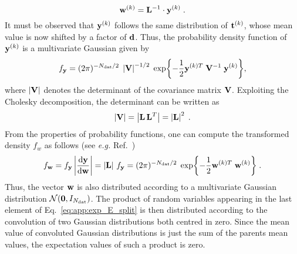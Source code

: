 \begin{equation}
    \mathbf{w}^{(k)} = \mathbf{L}^{-1} \cdot \mathbf{y}^{(k)} \;.
\end{equation}
It must be observed that $\mathbf{y}^{(k)}$ follows the same distribution of $\mathbf{t}^{(k)}$, whose mean value is now shifted by a factor of $\mathbf{d}$. Thus, the probability density function of $\mathbf{y}^{(k)}$ is a multivariate Gaussian given by
\begin{equation}
    f_{\mathbf{y}} = (2\pi)^{-N_{\textrm{dat}}/2} \; \left| \mathbf{V} \right|^{-1/2} \; \exp{-\frac{1}{2}{\mathbf{y}}^{(k)T} \; \mathbf{V}^{-1} \; \mathbf{y}^{(k)}},
\end{equation}
where $\left| \mathbf{V} \right|$ denotes the determinant of the covariance matrix $\mathbf{V}$. Exploiting the Cholesky decomposition, the determinant can be written as 
\begin{equation}
    \left| \mathbf{V} \right| = \left| \mathbf{L} \, \mathbf{L}^T \right| = \left| \mathbf{L} \right|^2 \;.
\end{equation}
From the properties of probability functions, one can compute the transformed density $f_w$ as follows (see \textit{e.g.} Ref.~\cite{Bohm:2005bu})
\begin{equation}
    f_{\mathbf{w}} = f_{\mathbf{y}} \left| \dv{\mathbf{y}}{\mathbf{w}} \right| = \left|\mathbf{L} \right| \, f_{\mathbf{y}} = (2\pi)^{-N_{\textrm{dat}}/2} \; \exp{-\frac{1}{2}\mathbf{w}^{(k)T} \; \mathbf{w}^{(k)}} \; .
\end{equation}
Thus, the vector $\mathbf{w}$ is also distributed according to a multivariate Gaussian distribution $\mathcal{N} (\mathbf{0}, I_{N_{\textrm{dat}}})$. The product of random variables appearing in the last element of Eq.~\eqref{eq:app:exp_E_split} is then distributed according to the convolution of two Gaussian distributions both centred in zero. Since the mean value of convoluted Gaussian distributions is just the sum of the parents mean values, the expectation values of such a product is zero.